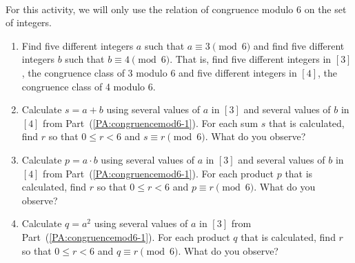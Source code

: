 \begin{previewactivity} \label{PA:congruencemod6} \hfill \\
For this activity, we will only use the relation of congruence modulo 6 on the set of integers.
\begin{enumerate}
\item Find five different integers  $a$  such that  $a \equiv 3 \pmod 6$ and find five different integers  $b$  such that  $b \equiv 4 \pmod 6$.  That is, find five different integers in $[3]$, the congruence class of  3 modulo 6  and five different integers in $[4]$, the congruence class of 4 modulo 6.  
\label{PA:congruencemod6-1}


\item Calculate  $s = a + b$ using several values of  $a$ in $[3]$ and several values of  $b$ in $[4]$ from Part~(\ref{PA:congruencemod6-1}).  For each sum $s$ that is calculated, find  $r$  so that  
$0 \leq r < 6$ and  $s \equiv r \pmod 6$.  What do you observe?

\item Calculate  $p = a \cdot b$ using several values of  $a$ in $[3]$ 
and several values of  $b$  in $[4]$ from Part~(\ref{PA:congruencemod6-1}).  For each product $p$ that is calculated, find  $r$  so that  $0 \leq r < 6$ and  $p \equiv r \pmod 6$.  What do you observe?

\item Calculate  $q = a^2$ using several values of  $a$ in $[3]$ from Part~(\ref{PA:congruencemod6-1}).  For each product $q$ that is calculated, find  $r$  so that  $0 \leq r < 6$ and  $q \equiv r \pmod 6$.  What do you observe?

\end{enumerate}
\end{previewactivity}
\hbreak

\endinput
